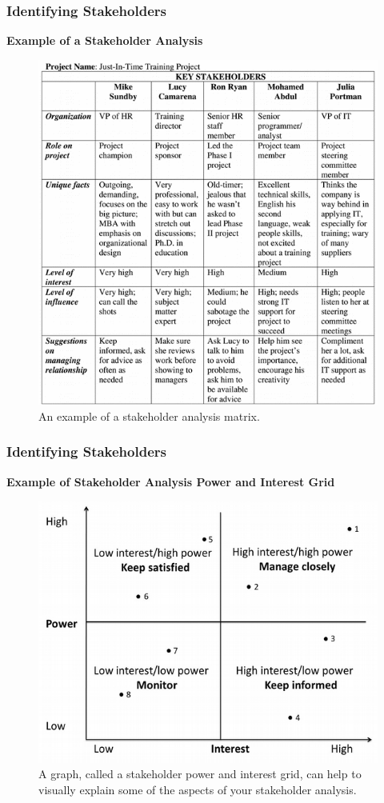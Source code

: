 \documentclass{beamer}
\begin{document}
\begin{frame}
\frametitle{Identifying Stakeholders}
\textbf{Example of a Stakeholder Analysis}
\begin{figure}
\includegraphics[scale=0.4]{stakeholder_analysis}
\caption{An example of a stakeholder analysis matrix.}
\end{figure}
\end{frame}

\begin{frame}
\frametitle{Identifying Stakeholders}
\textbf{Example of Stakeholder Analysis Power and Interest Grid}\\
\begin{figure}
\includegraphics[scale=0.5]{stakeholder_analysis_grid}
\caption{A graph, called a stakeholder power and interest grid, can help to visually explain some of the aspects of your stakeholder analysis.}
\end{figure}
\end{frame}
\end{document}
